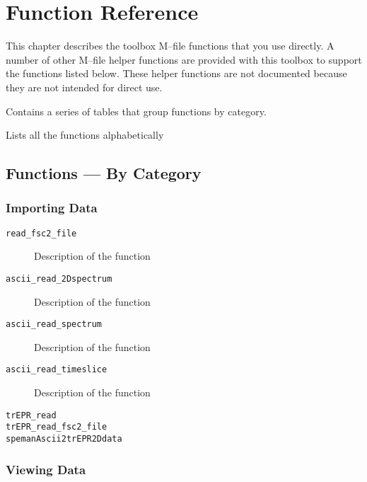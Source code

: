 \documentclass[a4paper]{refrep}
\begin{document}
\chapter{Function Reference}

This chapter describes the toolbox M--file functions that you use directly. A
number of other M--file helper functions are provided with this toolbox to
support the functions listed below. These helper functions are not documented
because they are not intended for direct use.

\vspace*{3\parsep}

\begin{description}\descriptioncolonfalse
  \item[Functions --- By Category] Contains a series of tables that group
  functions by category.
  \item[Functions --- Alphabetical List] Lists all the functions alphabetically 
\end{description}

\clearpage


\section{Functions --- By Category}

\subsection{Importing Data}

\begin{description}
  \item[\texttt{read\_fsc2\_file}] Description of the function
  \item[\texttt{ascii\_read\_2Dspectrum}] Description of the function
  \item[\texttt{ascii\_read\_spectrum}] Description of the function
  \item[\texttt{ascii\_read\_timeslice}] Description of the function
  \item[\texttt{trEPR\_read}]
  \item[\texttt{trEPR\_read\_fsc2\_file}]
  \item[\texttt{spemanAscii2trEPR2Ddata}]
\end{description}


\subsection{Viewing Data}
\end{document}
